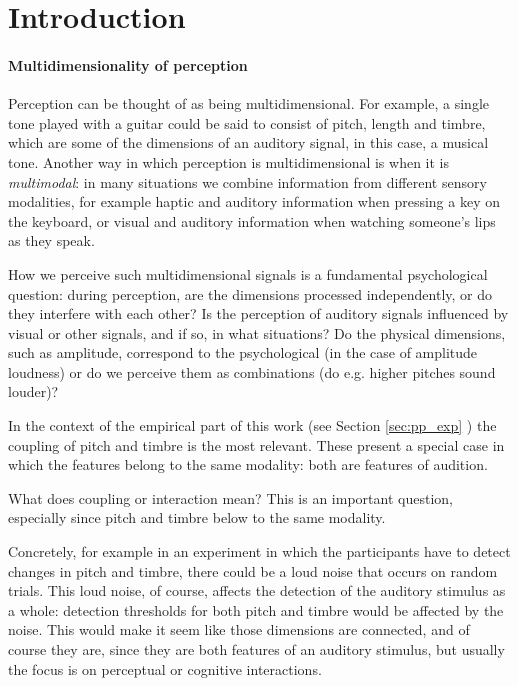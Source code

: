 \documentclass{article}\usepackage{knitr}
\begin{document}
\newpage

\tableofcontents

\newpage

\setcounter{page}{1}

\newpage


\section{Introduction}

\paragraph{Multidimensionality of perception}

Perception can be thought of as being multidimensional. For example, a single tone played with a guitar could be said to consist of pitch, length and timbre, which are some of the dimensions of an auditory signal, in this case, a musical tone. Another way in which perception is multidimensional is when it is \textit{multimodal}: in many situations we combine information from different sensory modalities, for example haptic and auditory information when pressing a key on the keyboard, or visual and auditory information when watching someone's lips as they speak.

How we perceive such multidimensional signals is a fundamental psychological question: during perception, are the dimensions processed independently, or do they interfere with each other? Is the perception of auditory signals influenced by visual or other signals, and if so, in what situations? Do the physical dimensions, such as amplitude, correspond to the psychological (in the case of amplitude loudness) or do we perceive them as combinations (do e.g. higher pitches sound louder)?

In the context of the empirical part of this work (see Section \ref{sec:pp_exp} \textit{}) the coupling of pitch and timbre is the most relevant. These present a special case in which the features belong to the same modality: both are features of  audition. 

What does coupling or interaction mean? This is an important question, especially since pitch and timbre below to the same modality. 

Concretely, for example in an experiment in which the participants have to detect changes in pitch and timbre, there could be a loud noise that occurs on random trials. This loud noise, of course, affects the detection of the auditory stimulus as a whole: detection thresholds for both pitch and timbre would be affected by the noise. This would make it seem like those dimensions are connected, and of course they are, since they are both features of an auditory stimulus, but usually the focus is on perceptual or cognitive interactions.
\end{document}
